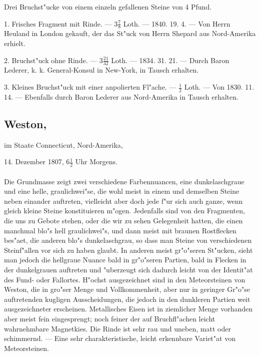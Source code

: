 \documentclass[a4paper, 11pt, oneside, polutonikogreek, german]{article}
\begin{document}
Drei Bruchst"ucke von einem einzeln gefallenen Steine von 4 Pfund.

1. Frisches Fragment mit Rinde. --- $3\frac{7}{8}$ Loth. --- 1840. 19. 4. --- Von Herrn Heuland in London gekauft, der das St"uck von Herrn Shepard aus Nord-Amerika erhielt.

2. Bruchst"uck ohne Rinde. --- $3\frac{21}{32}$ Loth. --- 1834. 31. 21. --- Durch Baron Lederer, k. k. General-Konsul in New-York, in Tausch erhalten.

3. Kleines Bruchst"uck mit einer anpolierten Fl"ache. --- $\frac{1}{2}$ Loth. --- Von 1830. 11. 14. --- Ebenfalls durch Baron Lederer aus Nord-Amerika in Tausch erhalten.
\subsection[Weston.]{Weston,}
\begin{center}
\small
im Staate Connecticut, Nord-Amerika,

14. Dezember 1807, $6\frac{1}{2}$ Uhr Morgens.
\end{center}
\paragraph{}
Die Grundmasse zeigt zwei verschiedene Farbennuancen, eine dunkelaschgraue und eine helle, graulichwei"se, die wohl meist in einem und demselben Steine neben einander auftreten, vielleicht aber doch jede f"ur sich auch ganze, wenn gleich kleine Steine konstituieren m"ogen. Jedenfalls sind von den Fragmenten, die uns zu Gebote stehen, oder die wir zu sehen Gelegenheit hatten, die einen manchmal blo"s hell graulichwei"s, und dann meist mit braunen Rostflecken bes"aet, die anderen blo"s dunkelaschgrau, so dass man Steine von verschiedenen Steinf"allen vor sich zu haben glaubt. In anderen meist gr"o"seren St"ucken, sieht man jedoch die hellgraue Nuance bald in gr"o"seren Partien, bald in Flecken in der dunkelgrauen auftreten und "uberzeugt sich dadurch leicht von der Identit"at des Fund- oder Fallortes. H"ochst ausgezeichnet sind in den Meteorsteinen von Weston, die in gro"ser Menge und Vollkommenheit, aber nur in geringer Gr"o"se auftretenden kugligen Ausscheidungen, die jedoch in den dunkleren Partien weit ausgezeichneter erscheinen. Metallisches Eisen ist in ziemlicher Menge vorhanden aber meist fein eingesprengt; noch feiner der auf Bruchfl"achen leicht wahrnehmbare Magnetkies. Die Rinde ist sehr rau und uneben, matt oder schimmernd. --- Eine sehr charakteristische, leicht erkennbare Variet"at von Meteorsteinen.
\end{document}
